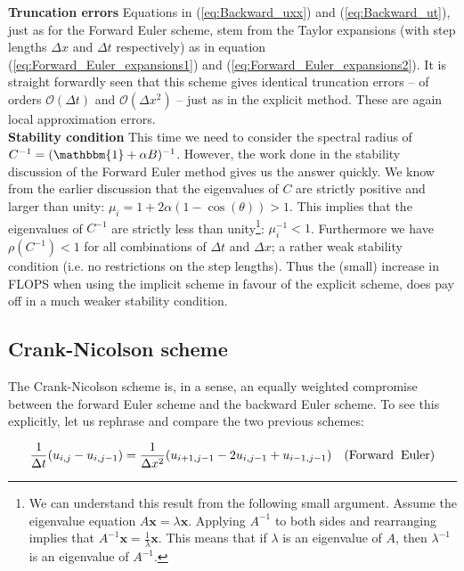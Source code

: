 \documentclass[a4paper, 11pt, notitlepage,english]{article}
\newcommand{\id}{\mathbbm{1}}
\begin{document}
\textbf{Truncation errors} \newline
Equations in (\ref{eq:Backward_uxx}) and (\ref{eq:Backward_ut}), just as for the Forward Euler scheme, stem from the Taylor expansions (with step lengths $\Delta x$ and $\Delta t$ respectively) as in equation (\ref{eq:Forward_Euler_expansions1}) and (\ref{eq:Forward_Euler_expansions2}). It is straight forwardly seen that this scheme gives identical truncation errors – of orders $\mathcal{O}(\Delta t)$ and $\mathcal{O}(\Delta x^2)$ – just as in the explicit method. These are again local approximation errors. \\

\textbf{Stability condition} \newline
This time we need to consider the spectral radius of $C^{-1} = (\id + \alpha B)^{-1}$. However, the work done in the stability discussion of the Forward Euler method gives us the answer quickly. We know from the earlier discussion that the eigenvalues of $C$ are strictly positive and larger than unity: $\mu_i = 1 + 2\alpha(1-\cos(\theta)) > 1$. This implies that the eigenvalues of $C^{-1}$ are strictly less than unity\footnote{We can understand this result from the following small argument. Assume the eigenvalue equation $A\boldsymbol{x} = \lambda \boldsymbol{x}$. Applying $A^{-1}$ to both sides and rearranging implies that $A^{-1}\boldsymbol{x} = \frac{1}{\lambda} \boldsymbol{x}$. This means that if $\lambda$ is an eigenvalue of $A$, then $\lambda^{-1}$ is an eigenvalue of $A^{-1}$.}: $\mu_i^{-1} < 1$. Furthermore we have $\rho(C^{-1}) < 1$ for all combinations of $\Delta t$ and $\Delta x$; a rather weak stability condition (i.e. no restrictions on the step lengths). Thus the (small) increase in FLOPS when using the implicit scheme in favour of the explicit scheme, does pay off in a much weaker stability condition.

\subsection{Crank-Nicolson scheme}
The Crank-Nicolson scheme is, in a sense, an equally weighted compromise between the forward Euler scheme and the backward Euler scheme. To see this explicitly, let us rephrase and compare the two previous schemes:

\begin{equation}
 \frac{1}{\Delta t} (u_{i,j}-u_{i,j-1}) = \frac{1}{\Delta x^2} (u_{i+1,j-1}-2u_{i,j-1}+u_{i-1,j-1}) \hspace{10pt} \mathrm{(Forward \hspace{2mm} Euler)}
\end{equation}
\end{document}
